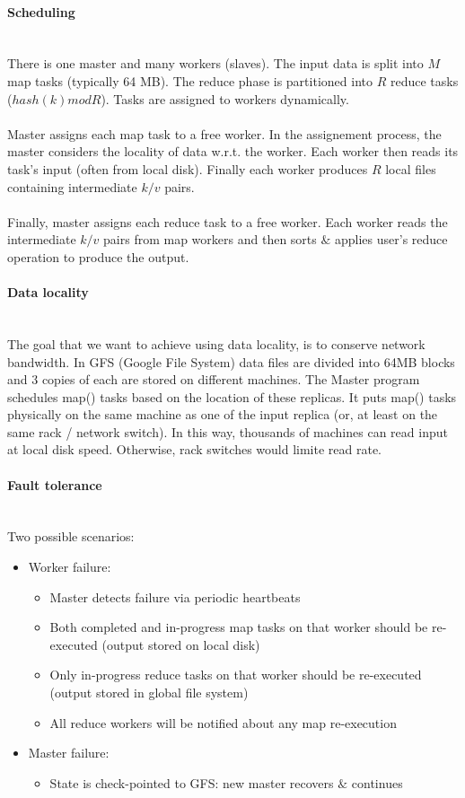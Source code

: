 \documentclass[10pt,a4paper]{article}
\newcommand{\myparagraph}[1]{\paragraph{#1}\mbox{}\\[0.05in]}
\begin{document}
\myparagraph{Scheduling}
There is one master and many workers (slaves). The input data is split into $M$ map tasks (typically 64 MB). The reduce phase is partitioned into $R$ reduce tasks ($hash(k) mod R$). Tasks are assigned to workers dynamically. \\ \\
Master assigns each map task to a free worker. In the assignement process, the master considers the locality of data w.r.t. the worker. Each worker then reads its task's input (often from local disk). Finally each worker produces $R$ local files containing intermediate $k/v$ pairs. \\ \\ Finally, master assigns each reduce task to a free worker. Each worker reads the intermediate $k/v$ pairs from map workers and then sorts $\&$ applies user's reduce operation to produce the output.
\myparagraph{Data locality}
The goal that we want to achieve using data locality, is to conserve network bandwidth. In GFS (Google File System) data files are divided into 64MB blocks and 3 copies of each are stored on different machines. The Master program schedules map() tasks based on the location of these replicas. It puts map() tasks physically on the same machine as one of the input replica (or, at least on the same rack / network switch). In this way, thousands of machines can read input at local disk speed. Otherwise, rack switches would limite read rate.
\myparagraph{Fault tolerance}
Two possible scenarios:
\begin{itemize}
	\item Worker failure:
	\begin{itemize}
		\item Master detects failure via periodic heartbeats
		\item Both completed and in-progress map tasks on that worker should be re-executed (output stored on local disk)
		\item Only in-progress reduce tasks on that worker should be re-executed (output stored in global file system)
		\item All reduce workers will be notified about any map re-execution
	\end{itemize}
	\item Master failure:
	\begin{itemize}
		\item State is check-pointed to GFS: new master recovers $\&$ continues
	\end{itemize}
\end{itemize} \pagebreak
\end{document}

